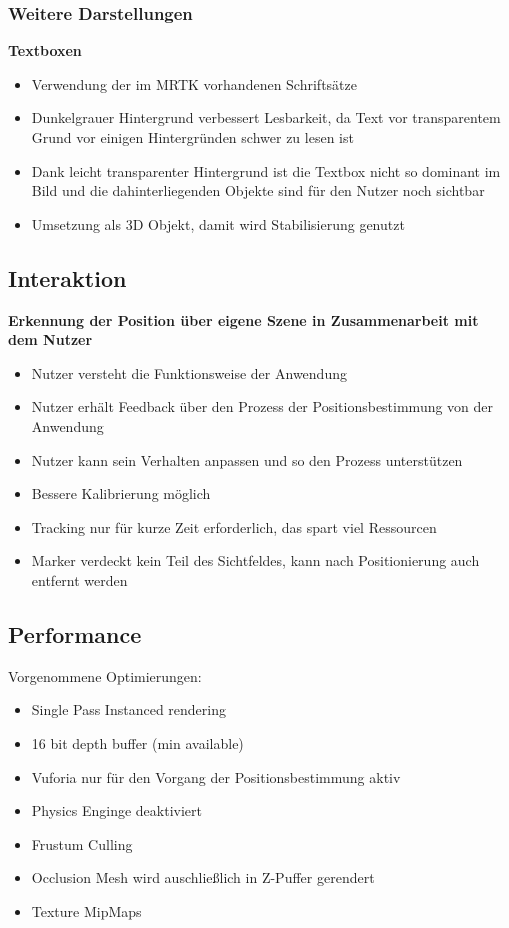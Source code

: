 \subsubsection{Weitere Darstellungen}
\textbf{Textboxen}
\begin{itemize}
	\item Verwendung der im MRTK vorhandenen Schriftsätze
	\item Dunkelgrauer Hintergrund verbessert Lesbarkeit, da Text vor transparentem Grund vor einigen Hintergründen schwer zu lesen ist
	\item Dank leicht transparenter Hintergrund ist die Textbox nicht so dominant im Bild und die dahinterliegenden Objekte sind für den Nutzer noch sichtbar
	\item Umsetzung als 3D Objekt, damit wird Stabilisierung genutzt
\end{itemize}


\subsection{Interaktion}
\textbf{Erkennung der Position über eigene Szene in Zusammenarbeit mit dem Nutzer}
\begin{itemize}
	\item Nutzer versteht die Funktionsweise der Anwendung
	\item Nutzer erhält Feedback über den Prozess der Positionsbestimmung von der Anwendung
	\item Nutzer kann sein Verhalten anpassen und so den Prozess unterstützen
	\item Bessere Kalibrierung möglich
	\item Tracking nur für kurze Zeit erforderlich, das spart viel Ressourcen
	\item Marker verdeckt kein Teil des Sichtfeldes, kann nach Positionierung auch entfernt werden
\end{itemize}

\subsection{Performance}
Vorgenommene Optimierungen:
\begin{itemize}
	\item Single Pass Instanced rendering
	\item 16 bit depth buffer (min available)
	\item Vuforia nur für den Vorgang der Positionsbestimmung aktiv
	\item Physics Enginge deaktiviert
	\item Frustum Culling
	\item Occlusion Mesh wird auschließlich in Z-Puffer gerendert
	\item Texture MipMaps
\end{itemize}
